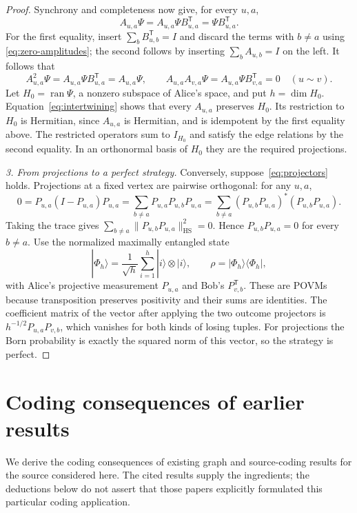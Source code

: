 \documentclass[11pt,a4paper]{article}
\numberwithin{equation}{section}
\numberwithin{figure}{section}
\numberwithin{table}{section}
\numberwithin{footnote}{section}
\theoremstyle{informal}\newtheorem*{informaltheorem}{Informal theorem}
\theoremstyle{definition}\newtheorem{example}{Example}[section]
\theoremstyle{remark}\newtheorem{remark}[theorem]{Remark}
\newcommand{\HS}{\mathrm{HS}}
\begin{document}
\begin{proof}
Synchrony and completeness now give, for every \(u,a\),
\begin{equation}\label{eq:intertwining}
 A_{u,a}\Psi
 =A_{u,a}\Psi B_{u,a}^{\mathsf T}
 =\Psi B_{u,a}^{\mathsf T}.
\end{equation}
For the first equality, insert \(\sum_bB_{u,b}^{\mathsf T}=I\)
and discard the terms with \(b\ne a\) using
\eqref{eq:zero-amplitudes}; the second follows by inserting
\(\sum_bA_{u,b}=I\) on the left. It follows that
\begin{equation}
 A_{u,a}^2\Psi
 =A_{u,a}\Psi B_{u,a}^{\mathsf T}=A_{u,a}\Psi,
 \qquad
 A_{u,a}A_{v,a}\Psi
 =A_{u,a}\Psi B_{v,a}^{\mathsf T}=0\quad(u\sim v).
\end{equation}
Let \(H_0=\operatorname{ran}\Psi\), a nonzero subspace of Alice's
space, and put \(h=\dim H_0\).
Equation~\eqref{eq:intertwining} shows that every \(A_{u,a}\)
preserves \(H_0\). Its restriction to \(H_0\) is Hermitian, since
\(A_{u,a}\) is Hermitian, and is idempotent by the first equality
above. The restricted operators sum to \(I_{H_0}\) and satisfy the
edge relations by the second equality. In an orthonormal basis
of \(H_0\) they are the required projections.

\emph{3. From projections to a perfect strategy.}
Conversely, suppose~\eqref{eq:projectors} holds. Projections at a
fixed vertex are pairwise orthogonal: for any \(u,a\),
\begin{equation}
 0=P_{u,a}(I-P_{u,a})P_{u,a}
   =\sum_{b\ne a}P_{u,a}P_{u,b}P_{u,a}
   =\sum_{b\ne a}(P_{u,b}P_{u,a})^*(P_{u,b}P_{u,a}).
\end{equation}
Taking the trace gives
\(\sum_{b\ne a}\|P_{u,b}P_{u,a}\|_{\HS}^2=0\).
Hence \(P_{u,b}P_{u,a}=0\) for every \(b\ne a\).
Use the normalized maximally entangled state
\begin{equation}
 |\Phi_h\rangle=\frac1{\sqrt h}\sum_{i=1}^h|i\rangle\otimes|i\rangle,
 \qquad \rho=|\Phi_h\rangle\langle\Phi_h|,
\end{equation}
with Alice's projective measurement \(P_{u,a}\) and Bob's
\(P_{v,b}^{\mathsf T}\). These are POVMs because transposition
preserves positivity and their sums are identities. The coefficient
matrix of the vector after applying the two outcome projectors is
\(h^{-1/2}P_{u,a}P_{v,b}\), which vanishes for both kinds of losing
tuples. For projections the Born probability is exactly the squared
norm of this vector, so the strategy is perfect.
\end{proof}

\section{Coding consequences of earlier results}\label{app:prior-regimes}
We derive the coding consequences of existing graph and source-coding
results for the source considered here. The cited results supply the
ingredients; the deductions below do not assert that those papers
explicitly formulated this particular coding application.
\end{document}
